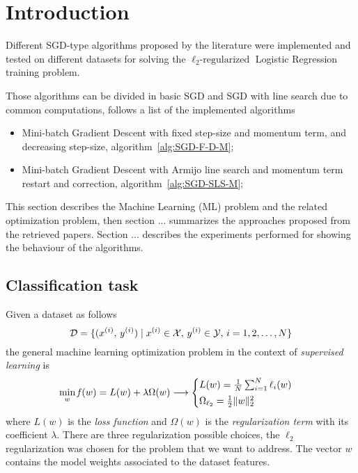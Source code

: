 \section{Introduction}\label{sc:intro}


Different SGD-type algorithms proposed by the literature were implemented and tested on different datasets for solving the $\ell_2\text{-regularized}$ Logistic Regression training problem.

Those algorithms can be divided in basic SGD and SGD with line search due to common computations, follows a list of the implemented algorithms
\begin{itemize}
\item Mini-batch Gradient Descent with fixed step-size and momentum term, and decreasing step-size, algorithm~\vref{alg:SGD-F-D-M};
\item Mini-batch Gradient Descent with Armijo line search and momentum term restart and correction, algorithm~\vref{alg:SGD-SLS-M};
\end{itemize}

This section describes the Machine Learning (ML) problem and the related optimization problem, then section ... summarizes the approaches proposed from the retrieved papers. Section ... describes the experiments performed for showing the behaviour of the algorithms.

\subsection{Classification task}

Given a dataset as follows
\[
\mathcal{D}=\{(x^{(i)},\,y^{(i)})\mid x^{(i)}\in\mathcal{X},\,y^{(i)}\in\mathcal{Y},\,i=1,2,\dots,N\}
\]
the general machine learning optimization problem in the context of \emph{supervised learning} is
\[
\min_{w}\operatorname*{\mathit{f}}(w)=L(w)+\lambda\Omega(w)\longrightarrow
\begin{cases}
L(w)=\frac{1}{N}\sum_{i=1}^N\ell_i(w) \\[0.5ex]
\Omega_{\ell_2}=\frac{1}{2}\lVert w\rVert_2^2
\end{cases}
\]
where $L(w)$ is the \emph{loss function} and $\Omega(w)$ is the \emph{regularization term} with its coefficient $\lambda$. There are three regularization possible choices, the $\ell_2$ regularization was chosen for the problem that we want to address. The vector $w$ contains the model weights associated to the dataset features.

